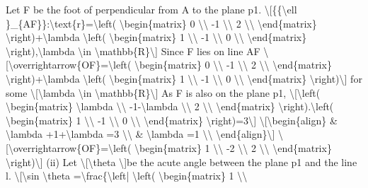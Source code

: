 \item Let F be the foot of perpendicular from A to the plane p1. \textbackslash{[}\{\{\textbackslash ell
\}\_\{AF\}\}:\textbackslash text\{r\}=\textbackslash left( \textbackslash begin\{matrix\}
0 \textbackslash\textbackslash{} -1 \textbackslash\textbackslash{}
2 \textbackslash\textbackslash{} \textbackslash end\{matrix\} \textbackslash right)+\textbackslash lambda
\textbackslash left( \textbackslash begin\{matrix\} 1 \textbackslash\textbackslash{}
-1 \textbackslash\textbackslash{} 0 \textbackslash\textbackslash{}
\textbackslash end\{matrix\} \textbackslash right),\textbackslash lambda
\textbackslash in \textbackslash mathbb\{R\}\textbackslash{]}
Since F lies on line AF \textbackslash{[}\textbackslash overrightarrow\{OF\}=\textbackslash left(
\textbackslash begin\{matrix\} 0 \textbackslash\textbackslash{}
-1 \textbackslash\textbackslash{} 2 \textbackslash\textbackslash{}
\textbackslash end\{matrix\} \textbackslash right)+\textbackslash lambda
\textbackslash left( \textbackslash begin\{matrix\} 1 \textbackslash\textbackslash{}
-1 \textbackslash\textbackslash{} 0 \textbackslash\textbackslash{}
\textbackslash end\{matrix\} \textbackslash right)\textbackslash{]}
for some \textbackslash{[}\textbackslash lambda \textbackslash in
\textbackslash mathbb\{R\}\textbackslash{]} As F is also on the
plane p1, \textbackslash{[}\textbackslash left( \textbackslash begin\{matrix\}
\textbackslash lambda \textbackslash\textbackslash{} -1-\textbackslash lambda
\textbackslash\textbackslash{} 2 \textbackslash\textbackslash{}
\textbackslash end\{matrix\} \textbackslash right).\textbackslash left(
\textbackslash begin\{matrix\} 1 \textbackslash\textbackslash{}
-1 \textbackslash\textbackslash{} 0 \textbackslash\textbackslash{}
\textbackslash end\{matrix\} \textbackslash right)=3\textbackslash{]}
\textbackslash{[}\textbackslash begin\{align\} \& \textbackslash lambda
+1+\textbackslash lambda =3 \textbackslash\textbackslash{} \& \textbackslash lambda
=1 \textbackslash\textbackslash{} \textbackslash end\{align\}\textbackslash{]}
\textbackslash{[}\textbackslash overrightarrow\{OF\}=\textbackslash left(
\textbackslash begin\{matrix\} 1 \textbackslash\textbackslash{}
-2 \textbackslash\textbackslash{} 2 \textbackslash\textbackslash{}
\textbackslash end\{matrix\} \textbackslash right)\textbackslash{]}
(ii) Let \textbackslash{[}\textbackslash theta \textbackslash{]}be
the acute angle between the plane p1 and the line l. \textbackslash{[}\textbackslash sin
\textbackslash theta =\textbackslash frac\{\textbackslash left|
\textbackslash left( \textbackslash begin\{matrix\} 1 \textbackslash\textbackslash{}

